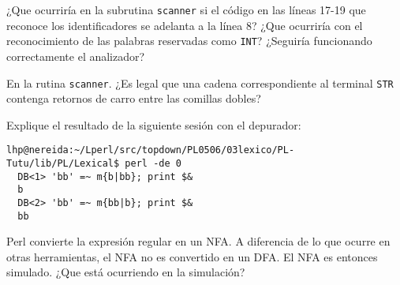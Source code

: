 ¿Que ocurriría en la subrutina \verb|scanner| si el código en las líneas
17-19 que reconoce los identificadores se adelanta a la línea 8? 
¿Que ocurriría con el reconocimiento de las palabras reservadas como
\verb|INT|? ¿Seguiría funcionando correctamente 
el analizador?

En la rutina \verb|scanner|. ¿Es legal que una cadena correspondiente
al terminal \verb|STR| contenga retornos de carro entre las comillas dobles?

Explique el resultado de la siguiente sesión con el depurador:
\begin{verbatim}
lhp@nereida:~/Lperl/src/topdown/PL0506/03lexico/PL-Tutu/lib/PL/Lexical$ perl -de 0
  DB<1> 'bb' =~ m{b|bb}; print $&
  b
  DB<2> 'bb' =~ m{bb|b}; print $&
  bb
\end{verbatim}
Perl convierte la expresión regular en un NFA. A diferencia de lo 
que ocurre en otras herramientas, el NFA no es convertido en un DFA.
El NFA es entonces simulado. ¿Que está ocurriendo en la simulación? 


